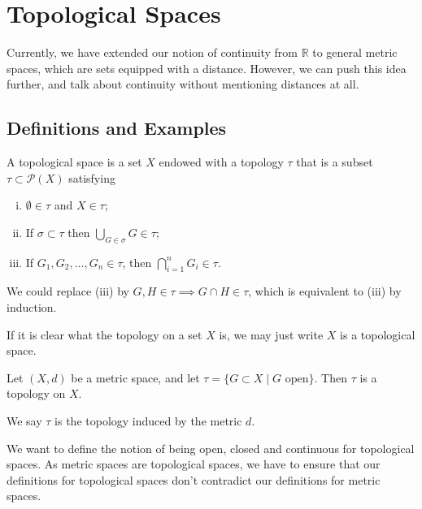 \documentclass[12pt]{article}
\begin{document}
\newpage

\section{Topological Spaces}%
\label{sec:topological_spaces}

Currently, we have extended our notion of continuity from $\mathbb{R}$ to general metric spaces, which are sets equipped with a distance. However, we can push this idea further, and talk about continuity without mentioning distances at all.

\subsection{Definitions and Examples}%
\label{sub:definitions_and_examples}

\begin{definition}
	A topological space is a set $X$ endowed with a topology $\tau$ that is a subset $\tau \subset \mathcal{P}(X)$ satisfying
	\begin{enumerate}[(i)]
		\item $\emptyset \in \tau$ and $X \in \tau$;
		\item If $\sigma \subset \tau$ then $\bigcup_{G \in \sigma}G \in \tau$;
		\item If $G_1, G_2, \ldots, G_n \in \tau$, then $\bigcap_{i = 1}^{n} G_i \in \tau$.
	\end{enumerate}
\end{definition}

\begin{remark}
	We could replace (iii) by $G, H \in \tau \implies G \cap H \in \tau$, which is equivalent to (iii) by induction.
\end{remark}

If it is clear what the topology on a set $X$ is, we may just write $X$ is a topological space.

\begin{exbox}
	Let $(X, d)$ be a metric space, and let $\tau = \{G \subset X \mid G \text{ open}\}$. Then $\tau$ is a topology on $X$.

	We say $\tau$ is the topology induced by the metric $d$.
\end{exbox}

We want to define the notion of being open, closed and continuous for topological spaces. As metric spaces are topological spaces, we have to ensure that our definitions for topological spaces don't contradict our definitions for metric spaces.
\end{document}
